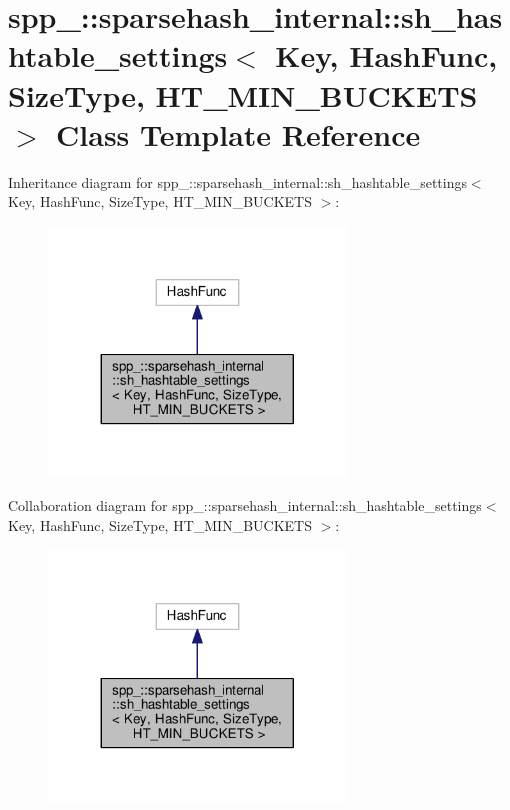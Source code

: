 \hypertarget{classspp___1_1sparsehash__internal_1_1sh__hashtable__settings}{}\section{spp\+\_\+\+:\+:sparsehash\+\_\+internal\+:\+:sh\+\_\+hashtable\+\_\+settings$<$ Key, Hash\+Func, Size\+Type, H\+T\+\_\+\+M\+I\+N\+\_\+\+B\+U\+C\+K\+E\+TS $>$ Class Template Reference}
\label{classspp___1_1sparsehash__internal_1_1sh__hashtable__settings}


Inheritance diagram for spp\+\_\+\+:\+:sparsehash\+\_\+internal\+:\+:sh\+\_\+hashtable\+\_\+settings$<$ Key, Hash\+Func, Size\+Type, H\+T\+\_\+\+M\+I\+N\+\_\+\+B\+U\+C\+K\+E\+TS $>$\+:\nopagebreak
\begin{figure}[H]
\begin{center}
\leavevmode
\includegraphics[width=224pt]{classspp___1_1sparsehash__internal_1_1sh__hashtable__settings__inherit__graph}
\end{center}
\end{figure}


Collaboration diagram for spp\+\_\+\+:\+:sparsehash\+\_\+internal\+:\+:sh\+\_\+hashtable\+\_\+settings$<$ Key, Hash\+Func, Size\+Type, H\+T\+\_\+\+M\+I\+N\+\_\+\+B\+U\+C\+K\+E\+TS $>$\+:\nopagebreak
\begin{figure}[H]
\begin{center}
\leavevmode
\includegraphics[width=224pt]{classspp___1_1sparsehash__internal_1_1sh__hashtable__settings__coll__graph}
\end{center}
\end{figure}
